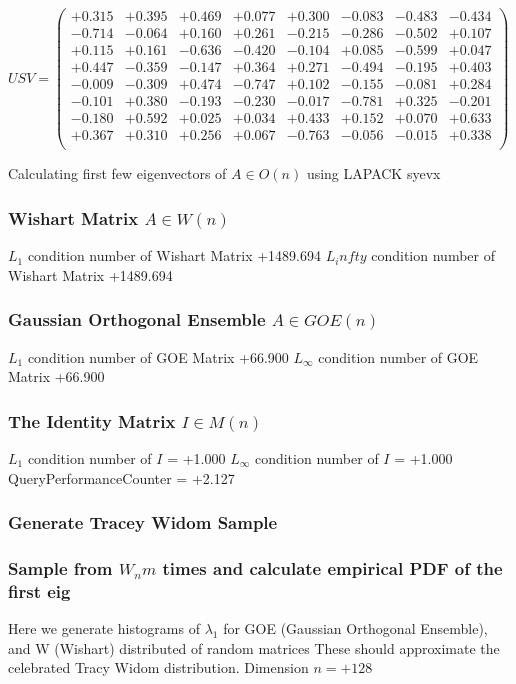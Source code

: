 \documentclass[9pt]{article}
\theoremstyle{plain}
\theoremstyle{definition}
\theoremstyle{remark}
\numberwithin{equation}{section}
\begin{document}
$U S V = \left(
\begin{array}{
cccccccc}
+0.315 & +0.395 & +0.469 & +0.077 & +0.300 & -0.083 & -0.483 & -0.434 \\
-0.714 & -0.064 & +0.160 & +0.261 & -0.215 & -0.286 & -0.502 & +0.107 \\
+0.115 & +0.161 & -0.636 & -0.420 & -0.104 & +0.085 & -0.599 & +0.047 \\
+0.447 & -0.359 & -0.147 & +0.364 & +0.271 & -0.494 & -0.195 & +0.403 \\
-0.009 & -0.309 & +0.474 & -0.747 & +0.102 & -0.155 & -0.081 & +0.284 \\
-0.101 & +0.380 & -0.193 & -0.230 & -0.017 & -0.781 & +0.325 & -0.201 \\
-0.180 & +0.592 & +0.025 & +0.034 & +0.433 & +0.152 & +0.070 & +0.633 \\
+0.367 & +0.310 & +0.256 & +0.067 & -0.763 & -0.056 & -0.015 & +0.338 \\
\end{array}
\right)$ \newline 

Calculating first few eigenvectors of $A \in O(n)$ using LAPACK syevx

\subsubsection{Wishart Matrix $A \in W(n)$}
$L_1$ condition number of Wishart Matrix +1489.694
$L_infty$ condition number of Wishart Matrix +1489.694
\subsubsection{Gaussian Orthogonal Ensemble $A \in GOE(n)$}
$L_1$ condition number of GOE Matrix +66.900
$L_\infty$ condition number of GOE Matrix +66.900
\subsubsection{The Identity Matrix $I \in M(n)$}
$L_1$ condition number of $I$ = +1.000
$L_\infty$ condition number of $I$ = +1.000
QueryPerformanceCounter  =  +2.127
\subsubsection{Generate Tracey Widom Sample}
\subsubsection{Sample from $W_n m$ times and calculate empirical PDF of the first eig}
Here we generate histograms of $\lambda_1$ for GOE (Gaussian Orthogonal Ensemble), and W (Wishart) 		 distributed of random matrices
These should approximate the celebrated Tracy Widom distribution.
Dimension $n = +128$
\end{document}
